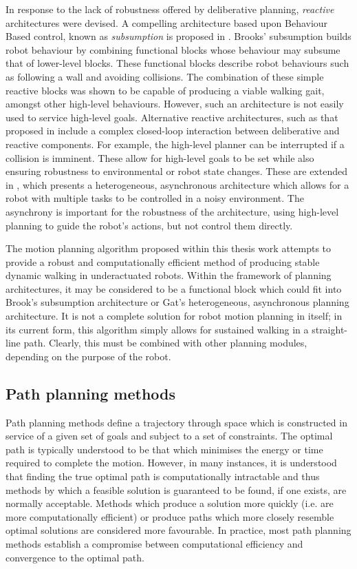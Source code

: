 In response to the lack of robustness offered by deliberative planning, \textit{reactive} architectures were devised. A compelling architecture based upon Behaviour Based control, known as \textit{subsumption} is proposed in \cite{brooks1986robust}. Brooks' subsumption builds robot behaviour by combining functional blocks whose behaviour may subsume that of lower-level blocks. These functional blocks describe robot behaviours such as following a wall and avoiding collisions. The combination of these simple reactive blocks was shown to be capable of producing a viable walking gait, amongst other high-level behaviours. However, such an architecture is not easily used to service high-level goals. Alternative reactive architectures, such as that proposed in \cite{georgeff1987reactive} include a complex closed-loop interaction between deliberative and reactive components. For example, the high-level planner can be interrupted if a collision is imminent. These allow for high-level goals to be set while also ensuring robustness to environmental or robot state changes. These are extended in \cite{gat1992integrating}, which presents a heterogeneous, asynchronous architecture which allows for a robot with multiple tasks to be controlled in a noisy environment. The asynchrony is important for the robustness of the architecture, using high-level planning to guide the robot's actions, but not control them directly. 

The motion planning algorithm proposed within this thesis work attempts to provide a robust and computationally efficient method of producing stable dynamic walking in underactuated robots. Within the framework of planning architectures, it may be considered to be a functional block which could fit into Brook's subsumption architecture or Gat's heterogeneous, asynchronous planning architecture. It is not a complete solution for robot motion planning in itself; in its current form, this algorithm simply allows for sustained walking in a straight-line path. Clearly, this must be combined with other planning modules, depending on the purpose of the robot.

\subsection{Path planning methods}
Path planning methods define a trajectory through space which is constructed in service of a given set of goals and subject to a set of constraints. The optimal path is typically understood to be that which minimises the energy or time required to complete the motion. However, in many instances, it is understood that finding the true optimal path is computationally intractable and thus methods by which a feasible solution is guaranteed to be found, if one exists, are normally acceptable. Methods which produce a solution more quickly (i.e. are more computationally efficient) or produce paths which more closely resemble optimal solutions are considered more favourable. In practice, most path planning methods establish a compromise between computational efficiency and convergence to the optimal path. 

